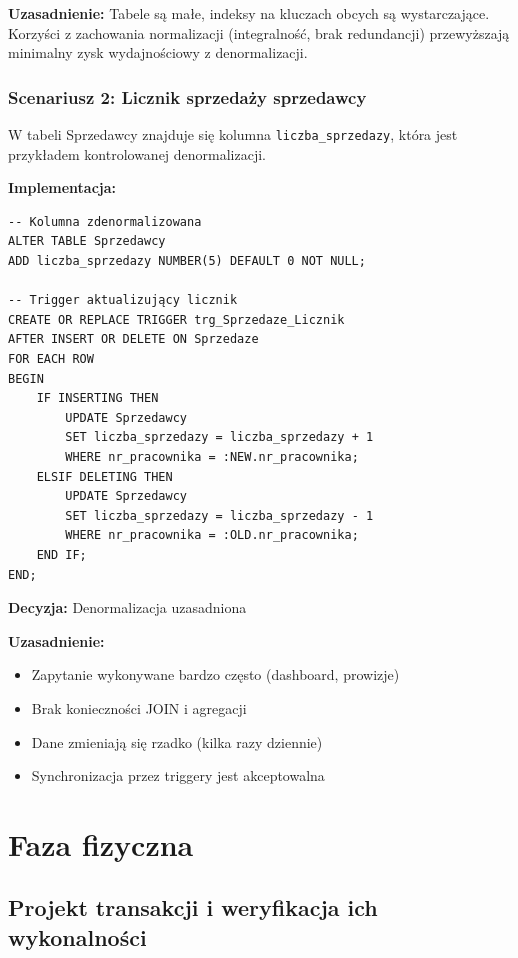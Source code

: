 \documentclass[a4paper,titleauthor]{mwart}
\begin{document}
	\textbf{Uzasadnienie:} Tabele są małe, indeksy na kluczach obcych są wystarczające. Korzyści z zachowania normalizacji (integralność, brak redundancji) przewyższają minimalny zysk wydajnościowy z denormalizacji.

	\subsubsection{Scenariusz 2: Licznik sprzedaży sprzedawcy}

	W tabeli Sprzedawcy znajduje się kolumna \texttt{liczba\_sprzedazy}, która jest przykładem kontrolowanej denormalizacji.

	\textbf{Implementacja:}

	\begin{verbatim}
-- Kolumna zdenormalizowana
ALTER TABLE Sprzedawcy 
ADD liczba_sprzedazy NUMBER(5) DEFAULT 0 NOT NULL;

-- Trigger aktualizujący licznik
CREATE OR REPLACE TRIGGER trg_Sprzedaze_Licznik
AFTER INSERT OR DELETE ON Sprzedaze
FOR EACH ROW
BEGIN
    IF INSERTING THEN
        UPDATE Sprzedawcy
        SET liczba_sprzedazy = liczba_sprzedazy + 1
        WHERE nr_pracownika = :NEW.nr_pracownika;
    ELSIF DELETING THEN
        UPDATE Sprzedawcy
        SET liczba_sprzedazy = liczba_sprzedazy - 1
        WHERE nr_pracownika = :OLD.nr_pracownika;
    END IF;
END;
	\end{verbatim}

	\textbf{Decyzja:} Denormalizacja uzasadniona

	\textbf{Uzasadnienie:}
	\begin{itemize}
		\item Zapytanie wykonywane bardzo często (dashboard, prowizje)
		\item Brak konieczności JOIN i agregacji
		\item Dane zmieniają się rzadko (kilka razy dziennie)
		\item Synchronizacja przez triggery jest akceptowalna
	\end{itemize}

	\section{Faza fizyczna}

	\subsection{Projekt transakcji i weryfikacja ich wykonalności}
\end{document}
